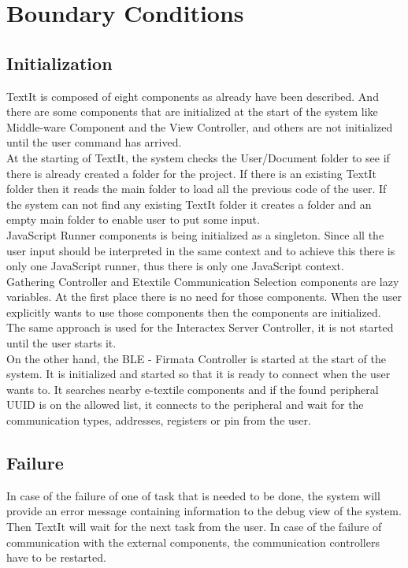 \section{Boundary Conditions}

\subsection{Initialization}
TextIt is composed of eight components as already have been described. And there are some components that are initialized at the start of the system like Middle-ware Component and the View Controller, and others are not initialized until the user command has arrived. \\

At the starting of TextIt, the system checks the User/Document folder to see if there is already created a folder for the project. If there is an existing TextIt folder then it reads the main folder to load all the previous code of the user. If the system can not find any existing TextIt folder it creates a folder and an empty main folder to enable user to put some input. \\

JavaScript Runner components is being initialized as a singleton. Since all the user input should be interpreted in the same context and to achieve this there is only one JavaScript runner, thus there is only one JavaScript context. \\

Gathering Controller and Etextile Communication Selection components are lazy variables. At the first place there is no need for those components. When the user explicitly wants to use those components then the components are initialized. The same approach is used for the Interactex Server Controller, it is not started until the user starts it. \\

On the other hand, the BLE - Firmata Controller is started at the start of the system. It is initialized and started so that it is ready to connect when the user wants to. It searches nearby e-textile components and if the found peripheral UUID is on the allowed list, it connects to the peripheral and wait for the communication types, addresses, registers or pin from the user. 





\subsection{Failure}
In case of the failure of one of task that is needed to be done, the system will provide an error message containing information to the debug view of the system. Then TextIt will wait for the next task from the user. In case of the failure of communication with the external components, the communication controllers have to be restarted. 

